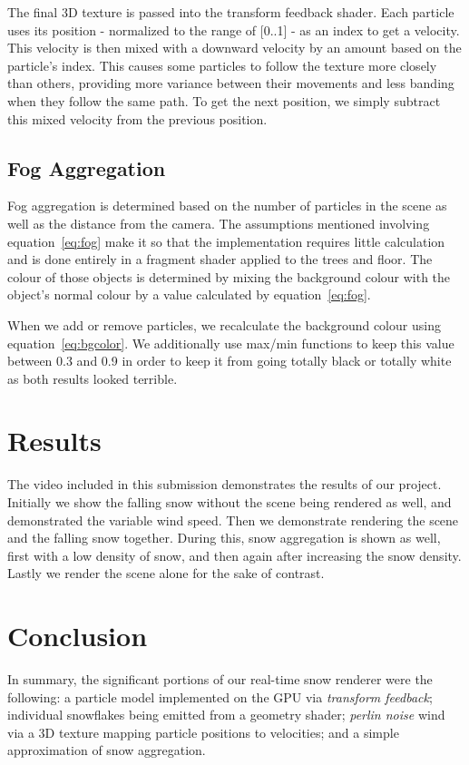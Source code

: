 \documentclass[conference]{acmsiggraph}
\begin{document}
The final 3D texture is passed into the transform feedback shader. Each particle uses its position - normalized to the range of [0..1] -  as an index to get a velocity. This velocity is then mixed with a downward velocity by an amount based on the particle's index. This causes some particles to follow the texture more closely than others, providing more variance between their movements and less banding when they follow the same path. To get the next position, we simply subtract this mixed velocity from the previous position.

\subsection{Fog Aggregation}
Fog aggregation is determined based on the number of particles in the scene as well as the distance from the camera. The assumptions mentioned involving equation~\ref{eq:fog} make it so that the implementation requires little calculation and is done entirely in a fragment shader applied to the trees and floor. The colour of those objects is determined by mixing the background colour with the object's normal colour by a value calculated by equation~\ref{eq:fog}.

When we add or remove particles, we recalculate the background colour using equation~\ref{eq:bgcolor}. We additionally use max/min functions to keep this value between 0.3 and 0.9 in order to keep it from going totally black or totally white as both results looked terrible.

\section{Results}
The video included in this submission demonstrates the results of our project. Initially we show the falling snow without the scene being rendered as well, and demonstrated the variable wind speed. Then we demonstrate rendering the scene and the falling snow together. During this, snow aggregation is shown as well, first with a low density of snow, and then again after increasing the snow density. Lastly we render the scene alone for the sake of contrast. 

\section{Conclusion}
In summary, the significant portions of our real-time snow renderer were the following: a particle model implemented on the GPU via \textit{transform feedback}; individual snowflakes being emitted from a geometry shader; \textit{perlin noise} wind via a 3D texture mapping particle positions to velocities; and a simple approximation of snow aggregation.
\end{document}

